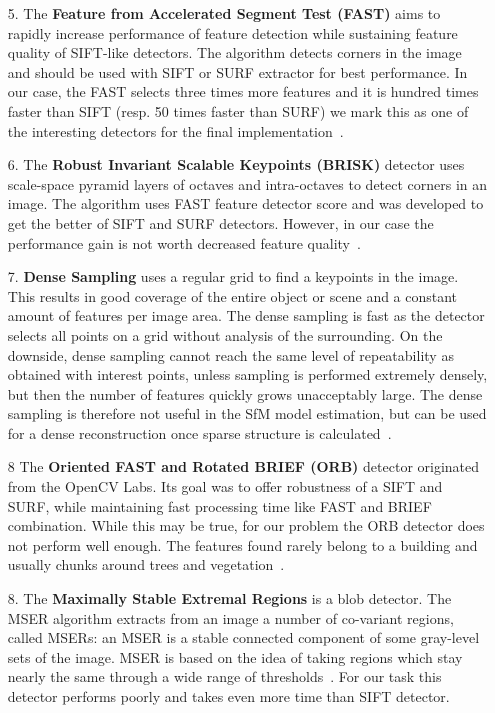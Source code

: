 \begin{itemize}
	\item[5.] The \textbf{Feature from Accelerated Segment Test (FAST)} aims to rapidly increase performance of feature detection while sustaining feature quality of SIFT-like detectors. The algorithm detects corners in the image and should be used with SIFT or SURF extractor for best performance. In our case,  the FAST selects three times more features and it is hundred times faster than SIFT (resp. 50 times faster than SURF) we mark this as one of the interesting detectors for the final implementation~\cite{article:fast}.
	
	\item[6.] The \textbf{Robust Invariant Scalable Keypoints (BRISK)} detector uses scale-space pyramid layers of octaves and intra-octaves to detect corners in an image. The algorithm uses FAST feature detector score and was developed to get the better of SIFT and SURF detectors. However, in our case the performance gain is not worth decreased feature quality~\cite{article:brisk}.
	
	\item[7.] \textbf{Dense Sampling} uses a regular grid to find a keypoints in the image. This results in good coverage of the entire object or scene and a constant amount of features per image area. The dense sampling is fast as the detector selects all points on a grid without analysis of the surrounding. On the downside, dense sampling cannot reach the same level of repeatability as obtained with interest points, unless sampling is performed extremely densely, but then the number of features quickly grows unacceptably large. The dense sampling is therefore not useful in the SfM model estimation, but can be used for a dense reconstruction once sparse structure is calculated~\cite{article:dense}.
	
	\item[8] The \textbf{Oriented FAST and Rotated BRIEF (ORB)} detector originated from the OpenCV Labs. Its goal was to offer robustness of a SIFT and SURF, while maintaining fast processing time like FAST and BRIEF combination. While this may be true, for our problem the ORB detector does not perform well enough. The features found rarely belong to a building and usually chunks around trees and vegetation~\cite{article:orb}.
	
	\item[8.] The \textbf{Maximally Stable Extremal Regions} is a blob detector. The MSER algorithm extracts from an image a number of co-variant regions, called MSERs: an MSER is a stable connected component of some gray-level sets of the image. MSER is based on the idea of taking regions which stay nearly the same through a wide range of thresholds~\cite{mser}. For our task this detector performs poorly and takes even more time than SIFT detector.
\end{itemize}

